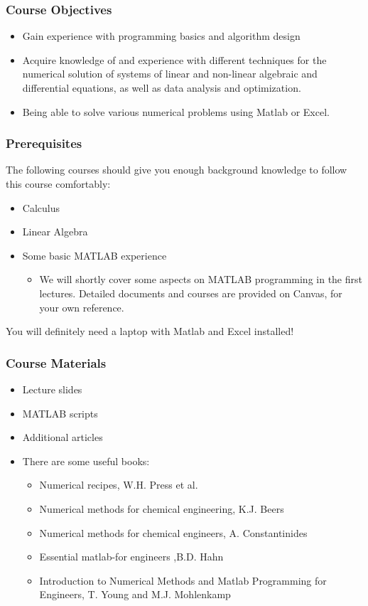 \documentclass[11pt,table,final,fleqn,xcolor={usenames,dvipsnames},handout]{beamer}
\begin{document}
\begin{frame}
 \frametitle{Course Objectives}
 \begin{itemize}
  \item Gain experience with programming basics and algorithm design
  \item Acquire knowledge of and experience with different techniques for the numerical solution of systems of linear and non-linear algebraic and differential equations, as well as data analysis and optimization.
  \item Being able to solve various numerical problems using Matlab or Excel. 
 \end{itemize}
\end{frame}

\begin{frame}
 \frametitle{Prerequisites}
  The following courses should give you enough background knowledge to follow this course comfortably:
 \begin{itemize}
   \item Calculus
   \item Linear Algebra
   \item Some basic MATLAB experience
     \begin{itemize}
       \item We will shortly cover some aspects on MATLAB programming in the first lectures. Detailed documents and courses are provided on Canvas, for your own reference.
     \end{itemize}
    \end{itemize}
    You will definitely need a laptop with Matlab and Excel installed!
\end{frame}

\begin{frame}
 \frametitle{Course Materials}
 \begin{itemize}
  \item Lecture slides
  \item MATLAB scripts
  \item Additional articles
  \item There are some useful books:
  \begin{itemize}
    \item Numerical recipes, W.H. Press et al.
    \item Numerical methods for chemical engineering, K.J. Beers
    \item Numerical methods for chemical engineers, A. Constantinides
    \item Essential matlab-for engineers ,B.D. Hahn
    \item Introduction to Numerical Methods and Matlab Programming for Engineers, T. Young and M.J. Mohlenkamp
  \end{itemize}
 \end{itemize}
\end{frame}
\end{document}
